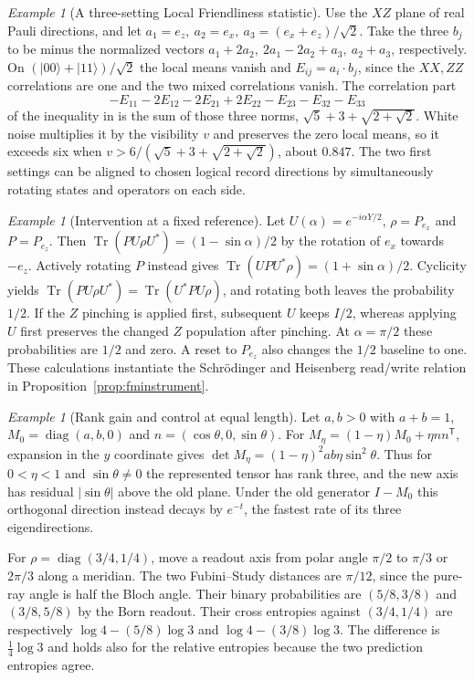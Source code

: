 \documentclass[aps,pra,onecolumn,superscriptaddress,nofootinbib,10pt]{revtex4-2}
\theoremstyle{definition}
\theoremstyle{remark}
\newtheorem{example}[theorem]{Example}
\newcommand{\tr}{\operatorname{Tr}}
\begin{document}
\begin{example}[A three-setting Local Friendliness statistic]\label{ob:lfexample}
Use the \(XZ\) plane of real Pauli directions, and let
\(a_1=e_z,\ a_2=e_x,\ a_3=(e_x+e_z)/\sqrt2\).
Take the three \(b_j\) to be minus the normalized vectors
\(a_1+2a_2,\ 2a_1-2a_2+a_3,\ a_2+a_3\), respectively.
On \((|00\rangle+|11\rangle)/\sqrt2\) the local means vanish and
\(E_{ij}=a_i\cdot b_j\), since the \(XX,ZZ\) correlations are one
and the two mixed correlations vanish. The correlation part
\[
 -E_{11}-2E_{12}-2E_{21}+2E_{22}-E_{23}-E_{32}-E_{33}
\]
of the inequality in \cite{n3:Bong} is the sum of those three norms,
\(\sqrt5+3+\sqrt{2+\sqrt2}\). White noise multiplies it by
the visibility \(v\) and preserves the zero local means, so it exceeds
six when \(v>6/(\sqrt5+3+\sqrt{2+\sqrt2})\), about \(0.847\).
The two first settings can be aligned to chosen logical record
directions by simultaneously rotating states and operators on each side.
\end{example}

\begin{example}[Intervention at a fixed reference]\label{ob:readwrite}
Let $U(\alpha)=e^{-i\alpha Y/2}$, $\rho=P_{e_x}$ and $P=P_{e_z}$.
Then $\tr(PU\rho U^*)=(1-\sin\alpha)/2$ by the rotation of
$e_x$ towards $-e_z$. Actively rotating $P$ instead gives
$\tr(UPU^*\rho)=(1+\sin\alpha)/2$.
Cyclicity yields $\tr(PU\rho U^*)=\tr(U^*PU\rho)$, and rotating both
leaves the probability $1/2$. If the $Z$ pinching is applied first,
subsequent $U$ keeps $I/2$, whereas applying $U$ first preserves
the changed $Z$ population after pinching. At $\alpha=\pi/2$ these
probabilities are $1/2$ and zero. A reset to $P_{e_z}$ also changes
the $1/2$ baseline to one. These calculations instantiate the
Schr\"odinger and Heisenberg read/write relation in
Proposition~\ref{prop:fminstrument}.
\end{example}

\begin{example}[Rank gain and control at equal length]\label{ob:rankcontrol}
Let $a,b>0$ with $a+b=1$, $M_0=\operatorname{diag}(a,b,0)$ and
$n=(\cos\theta,0,\sin\theta)$. For
$M_\eta=(1-\eta)M_0+\eta nn^{\mathsf T}$,
expansion in the $y$ coordinate gives
$\det M_\eta=(1-\eta)^2ab\eta\sin^2\theta$. Thus for $0<\eta<1$
and $\sin\theta\ne0$ the represented tensor has rank three,
and the new axis has residual $|\sin\theta|$ above the old plane.
Under the old generator $I-M_0$ this orthogonal direction instead
decays by $e^{-t}$, the fastest rate of its three eigendirections.

For $\rho=\operatorname{diag}(3/4,1/4)$, move a readout axis from
polar angle $\pi/2$ to $\pi/3$ or $2\pi/3$ along a meridian.
The two Fubini--Study distances are $\pi/12$, since the pure-ray
angle is half the Bloch angle. Their binary probabilities are
$(5/8,3/8)$ and $(3/8,5/8)$ by the Born readout.
Their cross entropies against $(3/4,1/4)$ are respectively
$\log4-(5/8)\log3$ and $\log4-(3/8)\log3$.
The difference is $\tfrac14\log3$ and holds also for the relative
entropies because the two prediction entropies agree.
\end{example}
\end{document}
